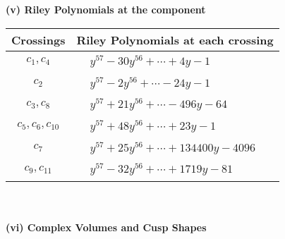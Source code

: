 \documentclass[1p]{elsarticle_modified}
\theoremstyle{definition}
\begin{document}
\newpage\renewcommand{\arraystretch}{1}
\flushleft \textbf{(v) Riley Polynomials at the component}\newline \\
\begin{tabular}{m{50pt}|m{274pt}}
Crossings & \hspace{64pt}Riley Polynomials at each crossing \\
\hline $$\begin{aligned}c_{1},c_{4}\end{aligned}$$&$\begin{aligned}
&y^{57}-30 y^{56}+\cdots+4 y-1
\end{aligned}$\\
\hline $$\begin{aligned}c_{2}\end{aligned}$$&$\begin{aligned}
&y^{57}-2 y^{56}+\cdots-24 y-1
\end{aligned}$\\
\hline $$\begin{aligned}c_{3},c_{8}\end{aligned}$$&$\begin{aligned}
&y^{57}+21 y^{56}+\cdots-496 y-64
\end{aligned}$\\
\hline $$\begin{aligned}c_{5},c_{6},c_{10}\end{aligned}$$&$\begin{aligned}
&y^{57}+48 y^{56}+\cdots+23 y-1
\end{aligned}$\\
\hline $$\begin{aligned}c_{7}\end{aligned}$$&$\begin{aligned}
&y^{57}+25 y^{56}+\cdots+134400 y-4096
\end{aligned}$\\
\hline $$\begin{aligned}c_{9},c_{11}\end{aligned}$$&$\begin{aligned}
&y^{57}-32 y^{56}+\cdots+1719 y-81
\end{aligned}$\\
\hline
\end{tabular}\\~\\
\newpage\flushleft \textbf{(vi) Complex Volumes and Cusp Shapes}
\end{document}
